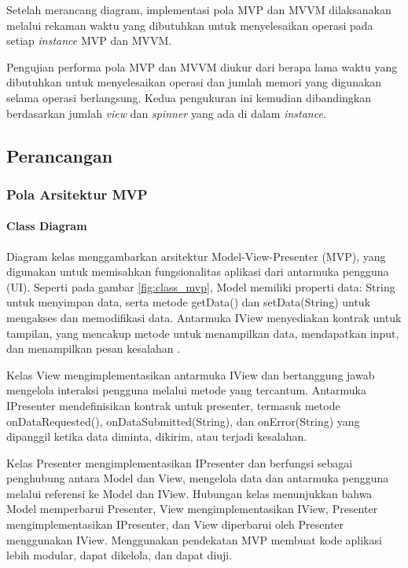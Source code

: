 \documentclass[conference]{IEEEtran}
\begin{document}
	Setelah merancang diagram, implementasi pola MVP dan MVVM dilaksanakan melalui rekaman waktu yang dibutuhkan untuk menyelesaikan operasi pada setiap \textit{instance} MVP dan MVVM.
	
	Pengujian performa pola MVP dan MVVM diukur dari berapa lama waktu yang dibutuhkan untuk menyelesaikan operasi dan jumlah memori yang digunakan selama operasi berlangsung. Kedua pengukuran ini kemudian dibandingkan berdasarkan jumlah \textit{view} dan \textit{spinner} yang ada di dalam \textit{instance}.
	
	\subsection{Perancangan}
	\subsubsection{Pola Arsitektur MVP}
	\paragraph{Class Diagram}
	Diagram kelas menggambarkan arsitektur Model-View-Presenter (MVP), yang digunakan untuk memisahkan fungsionalitas aplikasi dari antarmuka pengguna (UI). Seperti pada gambar \ref{fig:class_mvp}, Model memiliki properti data: String untuk menyimpan data, serta metode getData() dan setData(String) untuk mengakses dan memodifikasi data. Antarmuka IView menyediakan kontrak untuk tampilan, yang mencakup metode untuk menampilkan data, mendapatkan input, dan menampilkan pesan kesalahan \cite{ri2023}. 
	
	Kelas View mengimplementasikan antarmuka IView dan bertanggung jawab mengelola interaksi pengguna melalui metode yang tercantum. Antarmuka IPresenter mendefinisikan kontrak untuk presenter, termasuk metode onDataRequested(), onDataSubmitted(String), dan onError(String) yang dipanggil ketika data diminta, dikirim, atau terjadi kesalahan. 
	
	Kelas Presenter mengimplementasikan IPresenter dan berfungsi sebagai penghubung antara Model dan View, mengelola data dan antarmuka pengguna melalui referensi ke Model dan IView. Hubungan kelas menunjukkan bahwa Model memperbarui Presenter, View mengimplementasikan IView, Presenter mengimplementasikan IPresenter, dan View diperbarui oleh Presenter menggunakan IView. Menggunakan pendekatan MVP membuat kode aplikasi lebih modular, dapat dikelola, dan dapat diuji.
	
\end{document}
